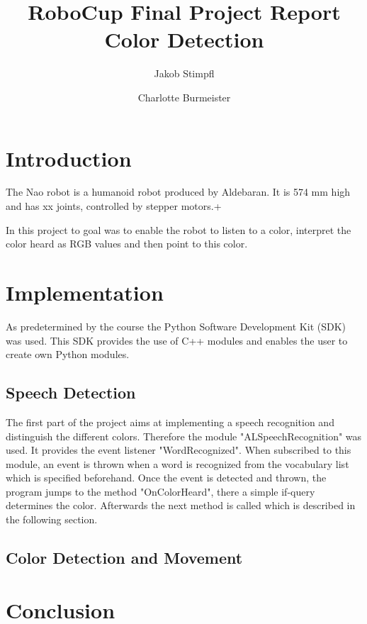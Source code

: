 \documentclass[a4paper]{article}
\title{RoboCup Final Project Report \\ Color Detection }
\author{Jakob Stimpfl \and Charlotte Burmeister}
\begin{document}
\maketitle
\tableofcontents




\section{Introduction}
The Nao robot is a humanoid robot produced by Aldebaran. It is 574 mm high and has xx joints, controlled by stepper motors.+

In this project to goal was to enable the robot to listen to a color, interpret the color heard as RGB values and then point to this color.



\section{Implementation}

As predetermined by the course the Python Software Development Kit (SDK) was used.
This SDK provides the use of C++ modules and enables the user to create own Python modules.\cite{API}


\subsection{Speech Detection}

The first part of the project aims at implementing a speech recognition and distinguish the different colors.
Therefore the module "ALSpeechRecognition" was used. It provides the event listener "WordRecognized". 
When subscribed to this module, an event is thrown when a word is recognized from the vocabulary list which is specified beforehand.
Once the event is detected and thrown, the program jumps to the method "OnColorHeard", there a simple if-query determines the color. 
Afterwards the next method is called which is described in the following section.
\subsection{Color Detection and Movement}
\section{Conclusion}
\end{document}
